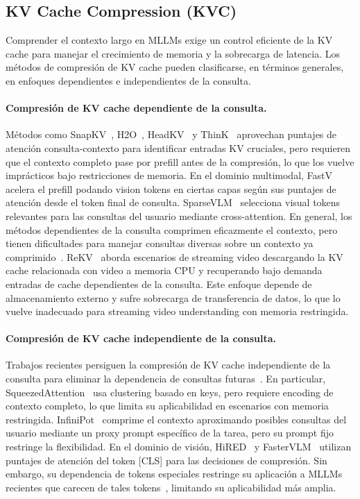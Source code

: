 \subsection{KV Cache Compression (KVC)}
Comprender el contexto largo en MLLMs exige un control eficiente de la KV cache para manejar el crecimiento de memoria y la sobrecarga de latencia. Los métodos de compresión de KV cache pueden clasificarse, en términos generales, en enfoques dependientes e independientes de la consulta.

\paragraph{Compresión de KV cache dependiente de la consulta.}
Métodos como SnapKV~\cite{li2024snapkv}, H2O~\cite{zhang2023ho}, HeadKV~\cite{fu2024headkv} y ThinK~\cite{xu2025think} aprovechan puntajes de atención consulta-contexto para identificar entradas KV cruciales, pero requieren que el contexto completo pase por prefill antes de la compresión, lo que los vuelve imprácticos bajo restricciones de memoria. En el dominio multimodal, FastV~\cite{chen2024image} acelera el prefill podando vision tokens en ciertas capas según sus puntajes de atención desde el token final de consulta.
SparseVLM~\cite{zhang2024sparsevlm} selecciona visual tokens relevantes para las consultas del usuario mediante cross-attention. En general, los métodos dependientes de la consulta comprimen eficazmente el contexto, pero tienen dificultades para manejar consultas diversas sobre un contexto ya comprimido~\cite{tang2025razorattention}. ReKV~\cite{Shangzhe2025streaming} aborda escenarios de streaming video descargando la KV cache relacionada con video a memoria CPU y recuperando bajo demanda entradas de cache dependientes de la consulta. Este enfoque depende de almacenamiento externo y sufre sobrecarga de transferencia de datos, lo que lo vuelve inadecuado para streaming video understanding con memoria restringida.

\paragraph{Compresión de KV cache independiente de la consulta.}
Trabajos recientes persiguen la compresión de KV cache independiente de la consulta para eliminar la dependencia de consultas futuras~\cite{ge2024model,devoto2024simple,hooper2024squeezed, kim2025kvzipqueryagnostickvcache, corallo2025ragtaskawarekvcache,park2025keydiffkeysimilaritybasedkv}.
En particular, SqueezedAttention~\cite{hooper2024squeezed} usa clustering basado en keys, pero requiere encoding de contexto completo, lo que limita su aplicabilidad en escenarios con memoria restringida.
InfiniPot~\cite{kim-etal-2024-infinipot} comprime el contexto aproximando posibles consultas del usuario mediante un proxy prompt específico de la tarea, pero su prompt fijo restringe la flexibilidad. En el dominio de visión, HiRED~\cite{arif2024hired} y FasterVLM~\cite{zhang2024fastervlm} utilizan puntajes de atención del token [CLS] para las decisiones de compresión. Sin embargo, su dependencia de tokens especiales restringe su aplicación a MLLMs recientes que carecen de tales tokens~\cite{qwen2.5,zhang2024llavanext-video}, limitando su aplicabilidad más amplia.
